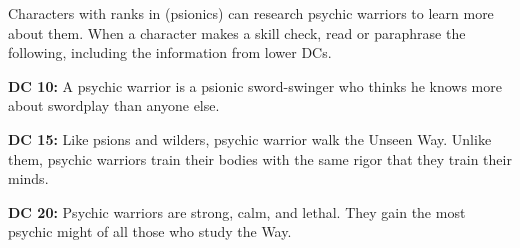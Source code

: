 Characters with ranks in  (psionics) can research psychic warriors to learn more about them. When a character makes a skill check, read or paraphrase the following, including the information from lower DCs.

\textbf{DC 10:} A psychic warrior is a psionic sword-swinger who thinks he knows more about swordplay than anyone else.

\textbf{DC 15:} Like psions and wilders, psychic warrior walk the Unseen Way. Unlike them, psychic warriors train their bodies with the same rigor that they train their minds.

\textbf{DC 20:} Psychic warriors are strong, calm, and lethal. They gain the most psychic might of all those who study the Way.
